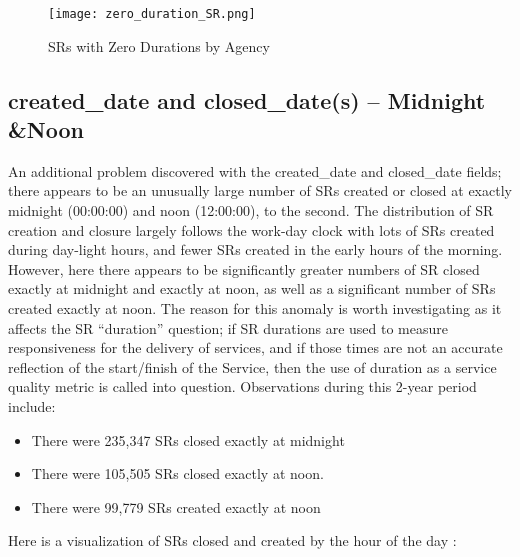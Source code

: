 \documentclass[12pt, titlepage]{article}
\begin{document}
	\begin{figure}[H]
		 \centering
		 \texttt{[image: zero\_duration\_SR.png]}
		 \caption{SRs with Zero Durations by Agency}
		 \label{fig:sero-duration}
	\end{figure}	
		
	\subsection{created\_date and closed\_date(s) -- Midnight \&Noon}
	An additional  problem discovered with the created\_date and closed\_date fields; there appears to be an unusually large number of 
	SRs created or closed at exactly midnight (00:00:00) and noon (12:00:00), to the second. The distribution of SR creation and closure 
	largely follows the work-day clock with lots of SRs created during day-light hours, and fewer SRs 
	created in the early hours of the morning. However, here there appears to be significantly greater numbers of SR closed exactly at midnight and exactly at noon,
	as well as a significant number of SRs created exactly at noon. The reason for this anomaly is worth investigating 
	as it affects the SR ``duration'' question; if SR durations are used to measure responsiveness
	for the delivery of services, and if those times are not an accurate reflection of the start/finish of the Service, then the use of
	duration as a service quality metric is called into question. Observations during this 2-year period include:
	
	\begin{itemize}
		    \item There were 235,347 SRs closed exactly at midnight
		    \item There were 105,505 SRs closed exactly at noon. 
		    \item There were 99,779 SRs created exactly at noon 
	\end{itemize}
	
	Here is a visualization of SRs closed and created by the hour of the day :
	
\end{document}
